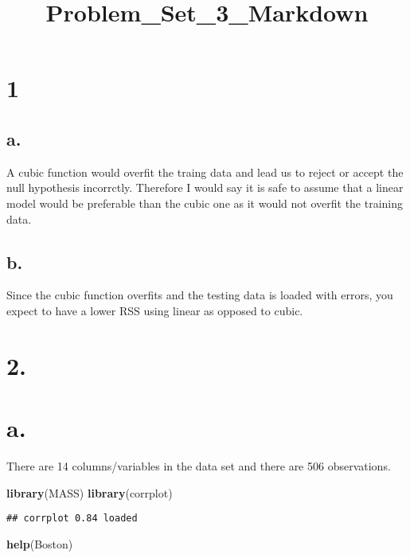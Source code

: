 \documentclass[]{article}
\title{Problem\_Set\_3\_Markdown}
\author{}
\date{}
\newenvironment{Shaded}{\begin{snugshade}}{\end{snugshade}}
\newcommand{\KeywordTok}[1]{\textcolor[rgb]{0.13,0.29,0.53}{\textbf{#1}}}
\newcommand{\NormalTok}[1]{#1}
\begin{document}
\maketitle

\section{1}\label{section}

\subsection{a.}\label{a.}

A cubic function would overfit the traing data and lead us to reject or
accept the null hypothesis incorrctly. Therefore I would say it is safe
to assume that a linear model would be preferable than the cubic one as
it would not overfit the training data.

\subsection{b.}\label{b.}

Since the cubic function overfits and the testing data is loaded with
errors, you expect to have a lower RSS using linear as opposed to cubic.

\section{2.}\label{section-1}

\section{a.}\label{a.-1}

There are 14 columns/variables in the data set and there are 506
observations.

\begin{Shaded}
\begin{Highlighting}[]
\KeywordTok{library}\NormalTok{(MASS)}
\KeywordTok{library}\NormalTok{(corrplot)}
\end{Highlighting}
\end{Shaded}

\begin{verbatim}
## corrplot 0.84 loaded
\end{verbatim}

\begin{Shaded}
\begin{Highlighting}[]
\KeywordTok{help}\NormalTok{(Boston)}
\end{Highlighting}
\end{Shaded}
\end{document}
